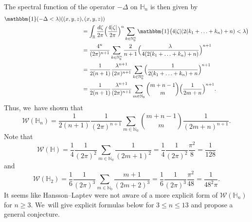 \documentclass[10pt]{amsart}
\theoremstyle{definition}
\newcommand{\1}{\mathbbm{1}}
\newcommand{\N}{\mathbb{N}}
\newcommand{\R}{\mathbb{R}}
\begin{document}
The spectral function of the operator $-\Delta$ on $\mathbb H_n$ is then given by
\begin{align*}
\1(-\Delta<\lambda)((x,y,z)&,(x,y,z)) \\
& = \int_\R \frac{d\zeta}{2\pi} \Bigl(\frac{4|\zeta|}{2\pi}\Bigr)^n \sum_{k \in\N_0^n} \1\bigl(4|\zeta|(2(k_1+\ldots+k_n)+n)<\lambda\bigr) \\
& = \frac{4^n}{(2\pi)^{n+1}} \sum_{k\in\N_0^n} \frac{2}{n+1} \Bigl(\frac{\lambda}{4(2(k_1+\ldots+k_n)+n)}\Bigr)^{n+1} \\
& = \frac{1}{2(n+1)} \frac{\lambda^{n+1}}{(2\pi)^{n+1}} \sum_{k\in\N_0^n} \Bigl(\frac{1}{2(k_1+\ldots+k_n)+n}\Bigr)^{n+1} \\
& = \frac{1}{2(n+1)} \frac{\lambda^{n+1}}{(2\pi)^{n+1}} \sum_{m\in\N_0} \binom{m+n-1}{m} \Bigl(\frac{1}{2m+n}\Bigr)^{n+1}.
\end{align*}
Thus, we~have shown that
\begin{equation}\label{w4}
\mathcal W(\mathbb H_n) = \frac{1}{2(n+1)} \frac{1}{(2\pi)^{n+1}} \sum_{m\in\N_0} \binom{m+n-1}{m} \frac{1}{(2m+n)^{n+1}}.
\end{equation}
Note that
\begin{equation}\label{eq:W1}
\mathcal W(\mathbb H) = \frac{1}{4} \frac{1}{(2\pi)^2} \sum_{m\in\N_0} \frac{1}{(2m+1)^2} = \frac14 \frac1{(2\pi)^2} \frac{\pi^2}8 = \frac1{128}
\end{equation}
and
\begin{equation}\label{eq:W2}
\mathcal W(\mathbb H_2) = \frac{1}{6} \frac{1}{(2\pi)^3} \sum_{m\in\N_0} \frac{m+1}{(2m+2)^3} = \frac{1}{6} \frac{1}{(2\pi)^3} \frac{\pi^2}{48} = \frac{1}{48^2 \pi}.
\end{equation}
It seems like Hansson--Laptev \cite{HL} were not aware of a more explicit form of $\mathcal W(\mathbb H_n)$ for $n\geq 3$. We~will give explicit formulas below for $3\leq n \leq 13$ and propose a general conjecture.
\end{document}
